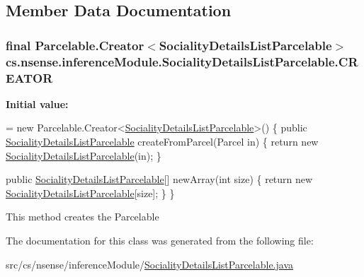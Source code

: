 \subsection{Member Data Documentation}
\hypertarget{classcs_1_1nsense_1_1inference_module_1_1_sociality_details_list_parcelable_a1ac9aab4e11776bc7b7296fa1a3c21bd}{
\subsubsection[{C\-R\-E\-A\-T\-O\-R}]{\setlength{\rightskip}{0pt plus 5cm}final Parcelable.\-Creator$<${\bf Sociality\-Details\-List\-Parcelable}$>$ cs.\-nsense.\-inference\-Module.\-Sociality\-Details\-List\-Parcelable.\-C\-R\-E\-A\-T\-O\-R\hspace{0.3cm}{\ttfamily [static]}}}\label{classcs_1_1nsense_1_1inference_module_1_1_sociality_details_list_parcelable_a1ac9aab4e11776bc7b7296fa1a3c21bd}
{\bfseries Initial value\-:}
\begin{DoxyCode}
=
            \textcolor{keyword}{new} Parcelable.Creator<\hyperlink{classcs_1_1nsense_1_1inference_module_1_1_sociality_details_list_parcelable_add706a34a4201215b8665f2b768d8438}{SocialityDetailsListParcelable}>() \{
        \textcolor{keyword}{public} \hyperlink{classcs_1_1nsense_1_1inference_module_1_1_sociality_details_list_parcelable_add706a34a4201215b8665f2b768d8438}{SocialityDetailsListParcelable} createFromParcel(Parcel in) \{
            \textcolor{keywordflow}{return} \textcolor{keyword}{new} \hyperlink{classcs_1_1nsense_1_1inference_module_1_1_sociality_details_list_parcelable_add706a34a4201215b8665f2b768d8438}{SocialityDetailsListParcelable}(in);
        \}

        \textcolor{keyword}{public} \hyperlink{classcs_1_1nsense_1_1inference_module_1_1_sociality_details_list_parcelable_add706a34a4201215b8665f2b768d8438}{SocialityDetailsListParcelable}[] newArray(\textcolor{keywordtype}{int} size) \{
            \textcolor{keywordflow}{return} \textcolor{keyword}{new} \hyperlink{classcs_1_1nsense_1_1inference_module_1_1_sociality_details_list_parcelable_add706a34a4201215b8665f2b768d8438}{SocialityDetailsListParcelable}[size];
        \}
    \}
\end{DoxyCode}
This method creates the Parcelable 

The documentation for this class was generated from the following file\-:\begin{DoxyCompactItemize}
\item 
src/cs/nsense/inference\-Module/\hyperlink{_sociality_details_list_parcelable_8java}{Sociality\-Details\-List\-Parcelable.\-java}\end{DoxyCompactItemize}
